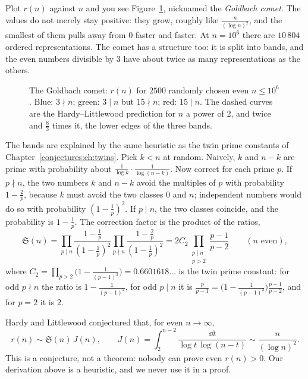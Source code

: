 Plot $r(n)$ against $n$ and you see Figure~\ref{conjectures:fig:comet}, nicknamed the \emph{Goldbach comet}. The values do not merely stay positive: they grow, roughly
like $\frac n{(\log n)^2}$, and the smallest of them pulls away from $0$ faster and faster. At $n=10^6$ there are $10\,804$ ordered representations.
The comet has a structure too: it is split into bands, and the even numbers divisible by $3$ have about twice as many representations as the others.

\begin{figure}[ht]
\centering
{}
\caption{The Goldbach comet: $r(n)$ for $2500$ randomly chosen even $n\le10^6$. Blue: $3\nmid n$; green: $3\mid n$ but $15\nmid n$; red: $15\mid n$. The
dashed curves are the Hardy--Littlewood prediction for $n$ a power of $2$, and twice and $\frac83$ times it, the lower edges of the three bands.}
\label{conjectures:fig:comet}
\end{figure}

The bands are explained by the same heuristic as the twin prime constants of Chapter~\ref{conjectures:ch:twins}. Pick $k<n$ at random. Naively, $k$ and $n-k$ are
prime with probability about $\frac1{\log k}\cdot\frac1{\log(n-k)}$. Now correct for each prime $p$. If $p\nmid n$, the two numbers $k$ and $n-k$ avoid
the multiples of $p$ with probability $1-\frac2p$, because $k$ must avoid the two classes $0$ and $n$; independent numbers would do so with probability
$(1-\frac1p)^2$. If $p\mid n$, the two classes coincide, and the probability is $1-\frac1p$. The correction factor is the product of the ratios,
\[
\mathfrak S(n)=\prod_{p\mid n}\frac{1-\frac1p}{(1-\frac1p)^2}\prod_{p\nmid n}\frac{1-\frac2p}{(1-\frac1p)^2}=2C_2\prod_{\substack{p\mid n\\p>2}}\frac{p-1}{p-2}\qquad(n\text{ even}),
\]
where $C_2=\prod_{p>2}\bigl(1-\frac1{(p-1)^2}\bigr)=0.6601618\ldots$ is the twin prime constant: for odd $p\nmid n$ the ratio is $1-\frac1{(p-1)^2}$, for odd
$p\mid n$ it is $\frac p{p-1}=\bigl(1-\frac1{(p-1)^2}\bigr)\frac{p-1}{p-2}$, and for $p=2$ it is $2$.

\begin{remark}\label{conjectures:rem:hlgoldbach}
Hardy and Littlewood conjectured that, for even $n\to\infty$,
\[
r(n)\sim\mathfrak S(n)\,J(n),\qquad J(n)=\int_2^{n-2}\frac{\dd t}{\log t\,\log(n-t)}\sim\frac n{(\log n)^2}.
\]
This is a conjecture, not a theorem: nobody can prove even $r(n)>0$. Our derivation above is a heuristic, and we never use it in a proof.
\end{remark}

